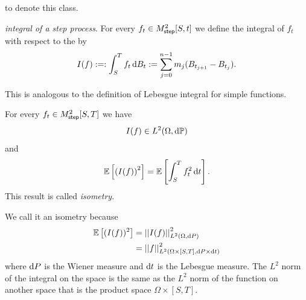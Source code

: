 \documentclass[12pt]{report}
\begin{document}
to denote this class.
\begin{definition}
	\emph{\ito{} integral of a step process}. For every $f_{t}\in M^{2}_{\mathsf{step}}[S,t]$ we define the \ito{} integral of $f_{t}$ with respect to the \bwm{} by
	\begin{equation*}
		I(f):=:\int_{S}^{T}f_{t}\mathop{}\!\mathrm{d} B_{t}:=\sum_{j=0}^{n-1}m_{j}(B_{t_{j+1}}-B_{t_{j}}).
	\end{equation*}
\end{definition}
This is analogous to the definition of Lebesgue integral for simple functions.
\begin{proposition}
	For every $f_{t}\in M^{2}_{\mathsf{step}}[S,T]$ we have
	\begin{equation*}
		I(f)\in L^{2}(\Omega,\mathop{}\!\mathrm{d}\mathbb{P})
	\end{equation*}
	and
	\begin{equation*}
		\mathbb{E}\left[\left(I(f)\right)^{2}\right]=\mathbb{E}\left[\int_{S}^{T}f^{2}_{t}\mathop{}\!\mathrm{d} t\right].
	\end{equation*}
	This result is called \emph{\ito{} isometry}.
\end{proposition}
We call it an isometry because
\begin{align*}
	\mathbb{E}\left[(I(f))^{2}\right]&=\left|\left|I(f)\right|\right|^{2}_{L^{2}(\Omega,\mathop{}\!\mathrm{d} P)}\\
	&=\left|\left|f\right|\right|^{2}_{L^{2}(\Omega\times[S,T],\mathop{}\!\mathrm{d} P\times\mathop{}\!\mathrm{d} t)}
\end{align*}
where $\mathop{}\!\mathrm{d} P$ is the Wiener measure and $\mathop{}\!\mathrm{d} t$ is the Lebesgue measure. The $L^{2}$ norm of the integral on the space is the same as the $L^{2}$ norm of the function on another space that is the product space $\Omega\times[S,T]$.
\end{document}
